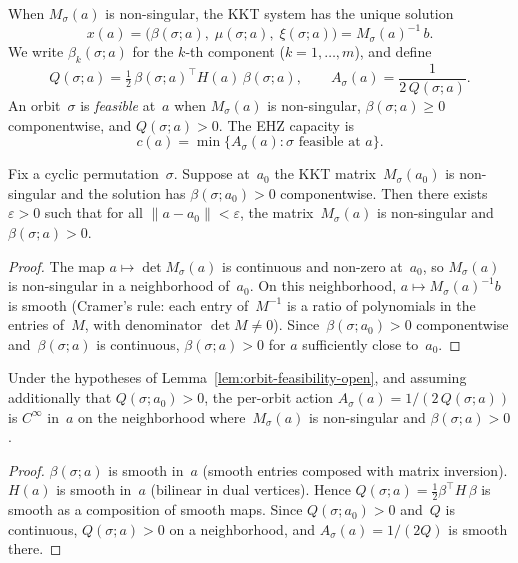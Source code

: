When $M_\sigma(a)$ is non-singular, the KKT system has the
unique solution
\[
  x(a) = \bigl(\beta(\sigma; a),\; \mu(\sigma; a),\; \xi(\sigma; a)\bigr)
  = M_\sigma(a)^{-1}\, b.
\]
We write $\beta_k(\sigma; a)$ for the $k$-th component
($k = 1, \ldots, m$), and define
\[
  Q(\sigma; a) = \tfrac{1}{2}\,\beta(\sigma; a)^\top
  H(a)\,\beta(\sigma; a),
  \qquad
  A_\sigma(a) = \frac{1}{2\,Q(\sigma; a)}.
\]
An orbit~$\sigma$ is \emph{feasible} at~$a$ when
$M_\sigma(a)$ is non-singular,
$\beta(\sigma; a) \geq 0$ componentwise,
and $Q(\sigma; a) > 0$.
The EHZ capacity is
\begin{equation}\label{eq:capacity-min}
  c(a) = \min\bigl\{A_\sigma(a) :
    \sigma \text{ feasible at } a\bigr\}.
\end{equation}



\begin{unverified}
\begin{lemma}\label{lem:orbit-feasibility-open}
Fix a cyclic permutation~$\sigma$.
Suppose at~$a_0$ the KKT matrix~$M_\sigma(a_0)$ is non-singular
and the solution has $\beta(\sigma; a_0) > 0$ componentwise.
Then there exists $\varepsilon > 0$ such that for all
$\|a - a_0\| < \varepsilon$,
the matrix~$M_\sigma(a)$ is non-singular and
$\beta(\sigma; a) > 0$.
\end{lemma}

\begin{proof}
The map $a \mapsto \det M_\sigma(a)$ is continuous and non-zero at~$a_0$,
so $M_\sigma(a)$ is non-singular in a neighborhood of~$a_0$.
On this neighborhood, $a \mapsto M_\sigma(a)^{-1} b$ is smooth
(Cramer's rule: each entry of~$M^{-1}$ is a ratio of
polynomials in the entries of~$M$, with denominator $\det M \neq 0$).
Since~$\beta(\sigma; a_0) > 0$ componentwise and~$\beta(\sigma; a)$ is
continuous, $\beta(\sigma; a) > 0$ for $a$ sufficiently close to~$a_0$.
\end{proof}
\end{unverified}


\begin{unverified}
\begin{lemma}\label{lem:per-orbit-smooth}
Under the hypotheses of Lemma~\ref{lem:orbit-feasibility-open},
and assuming additionally that $Q(\sigma; a_0) > 0$,
the per-orbit action $A_\sigma(a) = 1/(2\,Q(\sigma; a))$
is $C^\infty$ in~$a$ on the neighborhood where~$M_\sigma(a)$ is
non-singular and $\beta(\sigma; a) > 0$.
\end{lemma}

\begin{proof}
$\beta(\sigma; a)$ is smooth in~$a$ (smooth entries composed with matrix inversion).
$H(a)$ is smooth in~$a$ (bilinear in dual vertices).
Hence $Q(\sigma; a) = \tfrac{1}{2}\beta^\top H\,\beta$
is smooth as a composition of smooth maps.
Since $Q(\sigma; a_0) > 0$ and~$Q$ is continuous,
$Q(\sigma; a) > 0$ on a neighborhood, and
$A_\sigma(a) = 1/(2Q)$ is smooth there.
\end{proof}
\end{unverified}



